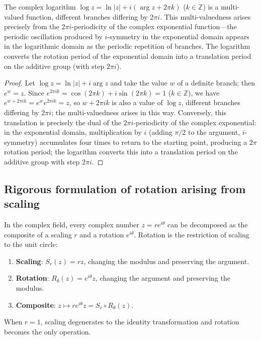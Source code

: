 \begin{proposition}\label{prop:complex_log_i_symmetry}
The complex logarithm $\log z = \ln|z| + i(\arg z + 2\pi k)$ ($k \in \mathbb{Z}$) is a multi-valued function, different branches differing by $2\pi i$. This multi-valuedness arises precisely from the $2\pi i$-periodicity of the complex exponential function---the periodic oscillation produced by $i$-symmetry in the exponential domain appears in the logarithmic domain as the periodic repetition of branches. The logarithm converts the rotation period of the exponential domain into a translation period on the additive group (with step $2\pi i$).
\end{proposition}

\begin{proof}
Let $\log z = \ln|z| + i\arg z$ and take the value $w$ of a definite branch; then $e^w = z$. Since $e^{2\pi i k} = \cos(2\pi k) + i\sin(2\pi k) = 1$ ($k\in\mathbb{Z}$), we have $e^{w + 2\pi i k} = e^w e^{2\pi i k} = z$, so $w + 2\pi i k$ is also a value of $\log z$, different branches differing by $2\pi i$; the multi-valuedness arises in this way. Conversely, this translation is precisely the dual of the $2\pi i$-periodicity of the complex exponential: in the exponential domain, multiplication by $i$ (adding $\pi/2$ to the argument, $i$-symmetry) accumulates four times to return to the starting point, producing a $2\pi$ rotation period; the logarithm converts this into a translation period on the additive group with step $2\pi i$.
\end{proof}

\subsection{\texorpdfstring{Rigorous formulation of rotation arising from scaling}{Rigorous formulation of rotation arising from scaling}}

\begin{proposition}\label{prop:rotation_from_scaling}
In the complex field, every complex number $z = re^{i\theta}$ can be decomposed as the composite of a scaling $r$ and a rotation $e^{i\theta}$. Rotation is the restriction of scaling to the unit circle:
\begin{enumerate}[label=(\roman*)]
    \item \textbf{Scaling}: $S_r(z) = rz$, changing the modulus and preserving the argument.
    \item \textbf{Rotation}: $R_\theta(z) = e^{i\theta}z$, changing the argument and preserving the modulus.
    \item \textbf{Composite}: $z \mapsto re^{i\theta}z = S_r \circ R_\theta(z)$.
\end{enumerate}
When $r = 1$, scaling degenerates to the identity transformation and rotation becomes the only operation.
\end{proposition}

